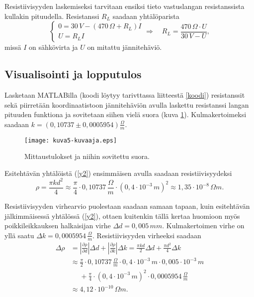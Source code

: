 \documentclass[a4paper,11pt]{article}
\begin{document}
{Resistiivisyyden laskemiseksi tarvitaan ensiksi tieto vastuslangan resistanssista kullakin pituudella. Resistanssi $R_L$ saadaan yhtälöparista
\begin{equation*}
    \begin{cases}
    0= 30\,V - (470\,\Omega + R_L)I\\
    U = R_LI
    \end{cases}
    \Rightarrow \quad R_L = \frac{470\,\Omega \cdot U}{30\,V - U},
\end{equation*}
missä $I$ on sähkövirta ja $U$ on mitattu jännitehäviö.

\subsection{Visualisointi ja lopputulos}

Lasketaan MATLABilla (koodi löytyy tarivttassa liitteestä \ref{koodi}) resistanssit sekä piirretään koordinaatistoon jännitehäviön avulla laskettu resistanssi langan pituuden funktiona ja sovitetaan siihen vielä suora (kuva \ref{fig:kuvaaja}). Kulmakertoimeksi saadaan $k=(0,10737\pm 0,0005954)\frac{\Omega}{m}$.

\begin{figure}
    \centering
    \texttt{[image: kuva5-kuvaaja.eps]}
    \caption{Mittaustulokset ja niihin sovitettu suora.}
    \label{fig:kuvaaja}
\end{figure}

Esitehtävän yhtälöistä (\ref{y2}) ensimmäisen avulla saadaan resistiivisyydeksi
\begin{equation*}
    \rho  = \frac{\pi k d^2}{4} \approx \frac{\pi}{4} \cdot 0,10737\,\frac{\Omega}{m} \cdot (0,4 \cdot 10^{-3}\,m)^2 \approx 1,35 \cdot 10^{-8}\,\Omega m.
\end{equation*}

Resistiivisyyden virhearvio puolestaan saadaan samaan tapaan, kuin esitehtävän jälkimmäisessä yhtälössä (\ref{y2}), ottaen kuitenkin tällä kertaa huomioon myös poikkileikkauksen halkaisijan virhe $\Delta d = 0,005\,mm$. Kulmakertoimen virhe on yllä saatu $\Delta k=0,0005954\,\frac{\Omega}{m}$. Resistiivisyyden virheeksi saadaan
\begin{align*}
    \Delta \rho & = \left\vert\frac{\partial \rho}{\partial d}\right\vert \Delta d + \left\vert\frac{\partial \rho}{\partial k}\right\vert \Delta k = \frac{\pi k d}{2} \Delta d + \frac{\pi d^2}{4} \Delta k\\
    & \approx \frac{\pi}{2} \cdot 0,10737\,\frac{\Omega}{m} \cdot 0,4 \cdot 10^{-3}\,m \cdot 0,005\cdot 10^{-3}\,m\\
    & \quad\,\, + \frac{\pi}{4} \cdot (0,4 \cdot 10^{-3}\,m)^2 \cdot 0,0005954\,\frac{\Omega}{m}\\
    & \approx 4,12 \cdot 10^{-10}\,\Omega m.
\end{align*}

}
\end{document}
